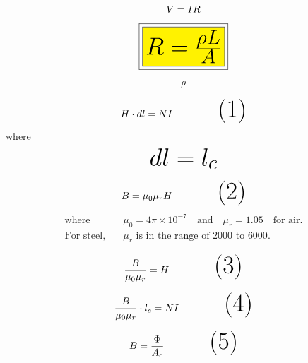 \documentclass{article}
\begin{document}
\begin{equation}
\Huge {V} = {I}{R}
\end{equation}

\vspace{0.5cm} %
\begin{equation}
\Huge \boxed{\fcolorbox{black}{yellow}{$\Huge R = \frac{\rho L}{A}$}}
\end{equation}

\vspace{0.5cm} %
\begin{equation}
\huge \rho
\end {equation}

\vspace{0.5cm} %
\begin{equation}
   \Huge  {H} \cdot d{l} = NI \tag{1}
\end{equation}
\Large where
\vspace{0.5cm} %
\[
   \text{\Huge $dl = l_c$}
\]


\vspace{0.5cm} %
\begin{equation}
    \Huge {B} = \mu_0 \mu_r {H}\tag{2}
\end{equation}
\begin{align*}
\text{where} \quad & \mu_0 = 4 \pi \times 10^{-7} \quad \text{and} \quad \mu_r = 1.05 \quad \text{for air}. \\
\text{For steel,} \quad & \mu_r \text{ is in the range of } 2000 \text{ to } 6000.
\end{align*}



\vspace{0.5cm} %
\begin{equation}
   \Huge  \frac{B}{\mu_0 \mu_r} = {H}\tag{3}
\end{equation}

\vspace{0.5cm} %
\begin{equation}
   \Huge  \frac{B}{\mu_0 \mu_r} \cdot {l_c}= NI \tag{4}
\end{equation}


\vspace{0.5cm} %
\begin{equation}
   \Huge  {B} =\frac {\Phi}{A_c}\tag{5}
\end{equation}
\end{document}
